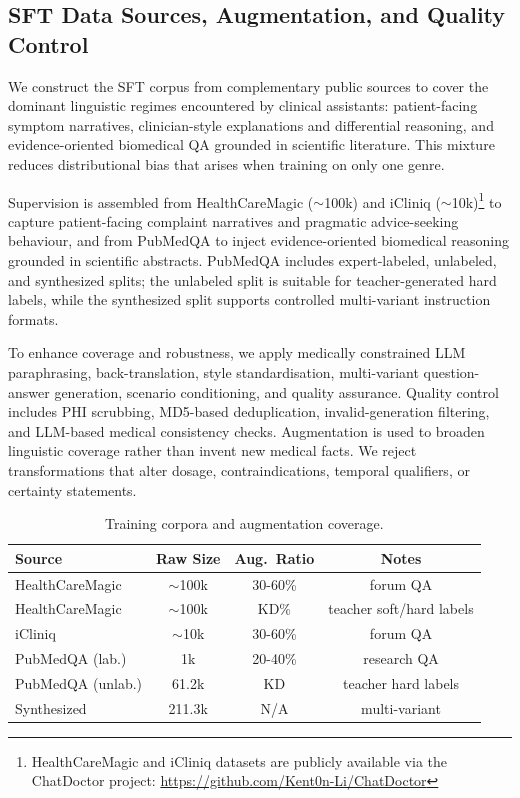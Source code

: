 \documentclass[conference]{IEEEtran}
\begin{document}
\subsection{SFT Data Sources, Augmentation, and Quality Control}
\label{app:sft-data-augmentation}

We construct the SFT corpus from complementary public sources to cover the dominant linguistic regimes encountered by clinical assistants: patient-facing symptom narratives, clinician-style explanations and differential reasoning, and evidence-oriented biomedical QA grounded in scientific literature. This mixture reduces distributional bias that arises when training on only one genre.

Supervision is assembled from HealthCareMagic ($\sim$100k) and iCliniq ($\sim$10k)\footnote{HealthCareMagic and iCliniq datasets are publicly available via the ChatDoctor project: \url{https://github.com/Kent0n-Li/ChatDoctor}}\cite{li2023chatdoctor} to capture patient-facing complaint narratives and pragmatic advice-seeking behaviour, and from PubMedQA \cite{pubmedqa} to inject evidence-oriented biomedical reasoning grounded in scientific abstracts. PubMedQA includes expert-labeled, unlabeled, and synthesized splits; the unlabeled split is suitable for teacher-generated hard labels, while the synthesized split supports controlled multi-variant instruction formats.

To enhance coverage and robustness, we apply medically constrained LLM paraphrasing, back-translation, style standardisation, multi-variant question-answer generation, scenario conditioning, and quality assurance. Quality control includes PHI scrubbing, MD5-based deduplication, invalid-generation filtering, and LLM-based medical consistency checks. Augmentation is used to broaden linguistic coverage rather than invent new medical facts. We reject transformations that alter dosage, contraindications, temporal qualifiers, or certainty statements.

\begin{table}[h!]
\centering
\caption{Training corpora and augmentation coverage.}
\label{tab:data}
\begin{tabular}{lccc}
\toprule
\scriptsize
\textbf{Source} & \textbf{Raw Size} & \textbf{Aug.\ Ratio} & \textbf{Notes} \\
\midrule
HealthCareMagic & $\sim$100k & 30-60\% & forum QA \\
HealthCareMagic & $\sim$100k & KD\% & teacher soft/hard labels \\
iCliniq & $\sim$10k & 30-60\% & forum QA \\
PubMedQA (lab.) & 1k & 20-40\% & research QA \\
PubMedQA (unlab.) & 61.2k & KD & teacher hard labels \\
Synthesized & 211.3k & N/A & multi-variant \\
\bottomrule
\end{tabular}
\vspace{-0.5em}
\end{table}
\end{document}
